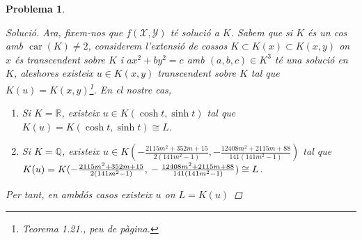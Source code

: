 \documentclass[compress]{article}
\newtheorem{problema}{Problema}
\theoremstyle{definition}
\DeclareMathOperator{\car}{car}
\begin{document}
\begin{problema}
\begin{proof}[Solució]
        Ara, fixem-nos que $f(\mathscr{X},\mathscr{Y})$ té solució a $K$. Sabem que si $K$ és un cos amb $\car(K)\neq2$, considerem l'extensió de cossos $K\subset K(x)\subset K(x,y)$ on $x$ és transcendent sobre $K$ i $ax^{2}+by^{2}=c$ amb $(a,b,c)\in K^{3}$ té una solució en $K$, aleshores existeix $u\in K(x,y)$ transcendent sobre $K$ tal que $K(u)=K(x,y)$\footnote{Teorema 1.21., peu de pàgina.}. En el nostre cas,
        \begin{enumerate}
            \item Si $K=\mathbb{R}$, existeix $u\in K(\cosh{t},\sinh{t})$ tal que $K(u)=K(\cosh{t},\sinh{t})\cong L$.
            \item Si $K=\mathbb{Q}$, existeix $u\in K(-\tfrac{2115m^{2}+352m+15}{2(141m^{2}-1)},-\tfrac{12408m^{2}+2115m+88}{141(141m^{2}-1)})$ tal que $K(u)=K(-\tfrac{2115m^{2}+352m+15}{2(141m^{2}-1)},\newline-\tfrac{12408m^{2}+2115m+88}{141(141m^{2}-1)})\cong L$.
        \end{enumerate}
        Per tant, en ambdós casos existeix $u$ on $L=K(u)$
    \end{proof}
\end{problema}
\end{document}
